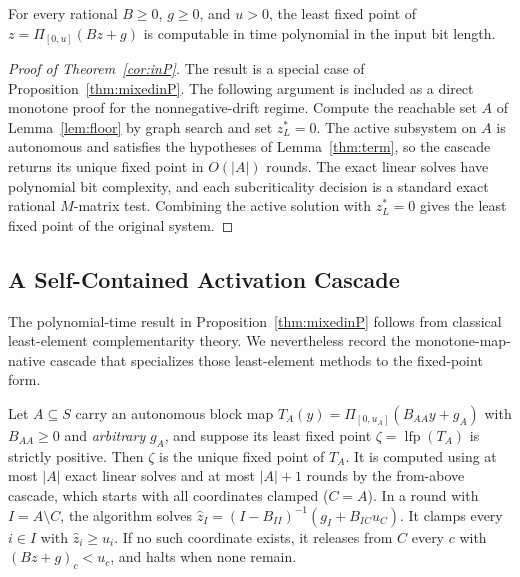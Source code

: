 \documentclass{llncs}
\newcommand{\clip}{\Pi}
\begin{document}
\begin{theorem}
\label{cor:inP}
For every rational \(B\ge0\), \(g\ge0\), and \(u>0\), the least fixed point of \(z=\clip_{[0,u]}(Bz+g)\) is computable in time polynomial in the input bit length.
\end{theorem}

\begin{proof}[Proof of Theorem~\ref{cor:inP}]
The result is a special case of Proposition~\ref{thm:mixedinP}. The following argument is included as a direct monotone proof for the nonnegative-drift regime.
Compute the reachable set \(A\) of Lemma~\ref{lem:floor} by graph search and set \(z^\ast_L=0\). The active subsystem on \(A\) is autonomous and satisfies the hypotheses of Lemma~\ref{thm:term}, so the cascade returns its unique fixed point in \(O(|A|)\) rounds. The exact linear solves have polynomial bit complexity, and each subcriticality decision is a standard exact rational \(M\)-matrix test. Combining the active solution with \(z^\ast_L=0\) gives the least fixed point of the original system.
\end{proof}

\subsection{A Self-Contained Activation Cascade}
\label{app:cascade}

The polynomial-time result in Proposition~\ref{thm:mixedinP} follows from classical least-element complementarity theory. We nevertheless record the monotone-map-native cascade that specializes those least-element methods to the fixed-point form.

\begin{lemma}
\label{lem:fromabove}
Let \(A\subseteq S\) carry an autonomous block map \(T_A(y)=\clip_{[0,u_A]}(B_{AA}y+g_A)\) with \(B_{AA}\ge0\) and \emph{arbitrary} \(g_A\), and suppose its least fixed point \(\zeta=\operatorname{lfp}(T_A)\) is strictly positive. Then \(\zeta\) is the unique fixed point of \(T_A\). It is computed using at most \(|A|\) exact linear solves and at most \(|A|+1\) rounds by the from-above cascade, which starts with all coordinates clamped (\(C=A\)). In a round with \(I=A\setminus C\), the algorithm solves \(\hat z_I=(I-B_{II})^{-1}(g_I+B_{IC}u_C)\). It clamps every \(i\in I\) with \(\hat z_i\ge u_i\). If no such coordinate exists, it releases from \(C\) every \(c\) with \((Bz+g)_c<u_c\), and halts when none remain.
\end{lemma}
\end{document}
